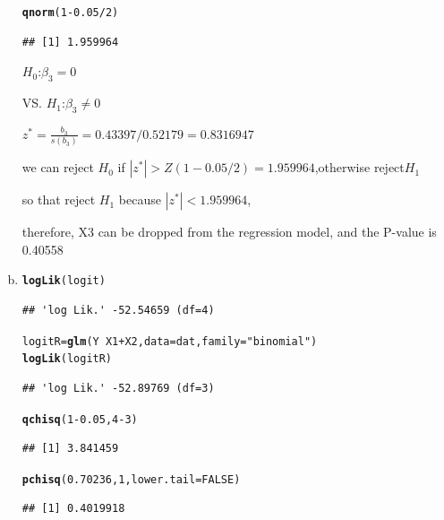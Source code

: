 \documentclass{article}\usepackage[]{graphicx}\usepackage[]{color}
\makeatletter
\newcommand{\hlnum}[1]{\textcolor[rgb]{0.686,0.059,0.569}{#1}}%
\newcommand{\hlstr}[1]{\textcolor[rgb]{0.192,0.494,0.8}{#1}}%
\newcommand{\hlopt}[1]{\textcolor[rgb]{0,0,0}{#1}}%
\newcommand{\hlstd}[1]{\textcolor[rgb]{0.345,0.345,0.345}{#1}}%
\newcommand{\hlkwb}[1]{\textcolor[rgb]{0.69,0.353,0.396}{#1}}%
\newcommand{\hlkwc}[1]{\textcolor[rgb]{0.333,0.667,0.333}{#1}}%
\newcommand{\hlkwd}[1]{\textcolor[rgb]{0.737,0.353,0.396}{\textbf{#1}}}%
\newenvironment{kframe}{%
 \def\at@end@of@kframe{}%
 \ifinner\ifhmode%
  \def\at@end@of@kframe{\end{minipage}}%
  \begin{minipage}{\columnwidth}%
 \fi\fi%
 \def\FrameCommand##1{\hskip\@totalleftmargin \hskip-\fboxsep
 \colorbox{shadecolor}{##1}\hskip-\fboxsep
     \hskip-\linewidth \hskip-\@totalleftmargin \hskip\columnwidth}%
 \MakeFramed {\advance\hsize-\width
   \@totalleftmargin\z@ \linewidth\hsize
   \@setminipage}}%
 {\par\unskip\endMakeFramed%
 \at@end@of@kframe}
\newenvironment{knitrout}{}{} %
\makeatother
\begin{document}
\begin{enumerate}[(a)]
\begin{knitrout}
\color{fgcolor}\begin{kframe}
\begin{alltt}
  \hlkwd{qnorm}\hlstd{(}\hlnum{1}\hlopt{-}\hlnum{0.05}\hlopt{/}\hlnum{2}\hlstd{)}
\end{alltt}
\begin{verbatim}
## [1] 1.959964
\end{verbatim}
\end{kframe}
\end{knitrout}

\begin{center}
$H_0$:$\beta_3=0$

VS. $H_1$:$\beta_3 \ne 0$

$z^*=\frac{b_3}{s(b_3)} = 0.43397/0.52179   = 0.8316947$

we can reject $H_0$ if $|z^*| > Z(1-0.05/2)=1.959964$,otherwise reject$H_1$

so that reject $H_1$ because $|z^*|<1.959964$,

therefore, X3 can be dropped from the regression model, and the P-value is 0.40558  
\end{center}

\item

\begin{knitrout}
\color{fgcolor}\begin{kframe}
\begin{alltt}
  \hlkwd{logLik}\hlstd{(logit)}
\end{alltt}
\begin{verbatim}
## 'log Lik.' -52.54659 (df=4)
\end{verbatim}
\begin{alltt}
  \hlstd{logitR} \hlkwb{=} \hlkwd{glm}\hlstd{(Y} \hlopt{~} \hlstd{X1}\hlopt{+}\hlstd{X2,} \hlkwc{data} \hlstd{= dat,} \hlkwc{family} \hlstd{=} \hlstr{"binomial"}\hlstd{)}
  \hlkwd{logLik}\hlstd{(logitR)}
\end{alltt}
\begin{verbatim}
## 'log Lik.' -52.89769 (df=3)
\end{verbatim}
\begin{alltt}
  \hlkwd{qchisq}\hlstd{(}\hlnum{1}\hlopt{-}\hlnum{0.05}\hlstd{,} \hlnum{4}\hlopt{-}\hlnum{3}\hlstd{)}
\end{alltt}
\begin{verbatim}
## [1] 3.841459
\end{verbatim}
\begin{alltt}
  \hlkwd{pchisq}\hlstd{(}\hlnum{0.70236}\hlstd{,} \hlnum{1}\hlstd{,} \hlkwc{lower.tail} \hlstd{=} \hlnum{FALSE}\hlstd{)}
\end{alltt}
\begin{verbatim}
## [1] 0.4019918
\end{verbatim}
\end{kframe}
\end{knitrout}


\end{enumerate}
\end{document}
